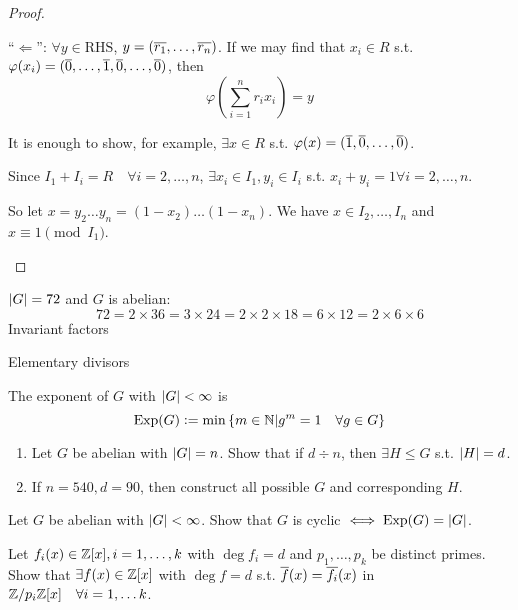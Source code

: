\begin{theorem}
\begin{proof}
\begin{enumerate}[(1)]
        ``$\Leftarrow$'': $\forall y \in \text{RHS}$,
        $y = (\overline{r_1}, \dots, \overline{r_n})$.
        If we may find that $x_i \in R$ s.t.
        $\varphi(x_i) = (\overline{0}, \dots, \overline{1}, \overline{0}, \dots, \overline{0})$,
        then
        \[
          \varphi\left(\sum_{i=1}^n r_ix_i \right) = y
        \]

        It is enough to show, for example, $\exists x \in R$ s.t.
        $\varphi(x) = (\overline{1}, \overline{0}, \dots, \overline{0})$.

        Since $I_1 + I_i = R \quad \forall i = 2, \dots, n$,
        $\exists x_i \in I_1, y_i \in I_i$ s.t. $x_i + y_i = 1
        \forall i = 2, \dots, n$.

        So let $x = y_2\dots y_n = (1-x_2)\dots(1-x_n)$.
        We have $x \in I_2, \dots, I_n$ and $x \equiv 1 \pmod {I_1}$.
    \end{enumerate}
  \end{proof}
\end{theorem}

\begin{example}
  $\lvert G\rvert = 72$ and $G$ is abelian:
  \[
    72 = 2 \times 36 = 3 \times 24 = 2 \times 2 \times 18
    = 6 \times 12 = 2 \times 6 \times 6
  \]
  Invariant factors

  Elementary divisors
\end{example}

\begin{definition}
  The exponent of $G$ with $\lvert G\rvert < \infty$ is
  \[
    \operatorname{Exp}(G) \vcentcolon= \min \left\{
      m \in \mathbb{N} \middle| g^m = 1 \quad \forall g \in G
    \right\}
  \]
\end{definition}

\begin{exercise} \mbox{}
  \begin{enumerate}
    \item Let $G$ be abelian with $\lvert G\rvert = n$. Show that if $d \div n$, then
      $\exists H \le G$ s.t. $\lvert H\rvert = d$.
    \item If $n=540, d=90$, then construct all possible $G$ and
      corresponding $H$.
  \end{enumerate}
\end{exercise}

\begin{exercise}
  Let $G$ be abelian with $\lvert G\rvert < \infty$. Show that $G$ is cyclic
  $\iff \operatorname{Exp}(G) = \lvert G\rvert$.
\end{exercise}

\begin{exercise}
  Let $f_i(x) \in \mathbb{Z}[x], i = 1, \dots, k$ with $\deg f_i = d$ and
  $p_1, \dots, p_k$ be distinct primes.
  Show that $\exists f(x) \in \mathbb{Z}[x]$ with $\deg f = d$ s.t.
  $\overline{f}(x) = \overline{f_i}(x)$ in 
  ${\mathbb{Z}}/{p_i\mathbb{Z}}[x] \quad \forall i = 1, \dots k$.
\end{exercise}
